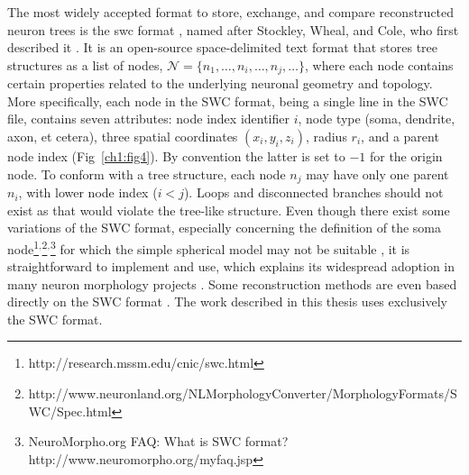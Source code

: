 The most widely accepted format to store, exchange, and compare reconstructed neuron trees is the \gls{swc} format \cite{cannon1998line}, named after Stockley, Wheal, and Cole, who first described it \cite{stockley1993system}. It is an open-source space-delimited text format that stores tree structures as a list of nodes, $\mathcal{N} = \{ n_1, \dots , n_i, \dots , n_j, \dots  \}$, where each node contains certain properties related to the underlying neuronal geometry and topology. More specifically, each node in the SWC format, being a single line in the SWC file, contains seven attributes: node index identifier $i$, node type (soma, dendrite, axon, et cetera), three spatial coordinates $(x_i,y_i,z_i)$, radius $r_i$, and a parent node index (Fig~\ref{ch1:fig4}). By convention the latter is set to $-1$ for the origin node. To conform with a tree structure, each node $n_j$ may have only one parent $n_i$, with lower node index ($i<j$). Loops and disconnected branches should not exist as that would violate the tree-like structure. Even though there exist some variations of the SWC format, especially concerning the definition of the soma node\footnote{http://research.mssm.edu/cnic/swc.html}$^,$\footnote{http://www.neuronland.org/NLMorphologyConverter/MorphologyFormats/SWC/Spec.html}$^,$\footnote{NeuroMorpho.org FAQ: What is SWC format? http://www.neuromorpho.org/myfaq.jsp} for which the simple spherical model may not be suitable \cite{bakker2016web}, it is straightforward to implement and use, which explains its widespread adoption in many neuron morphology projects \cite{ascoli2007neuromorpho, peng2015bigneuron}. Some reconstruction methods are even based directly on the SWC format \cite{feng2015neutube}. The work described in this thesis uses  exclusively the SWC format.
 
